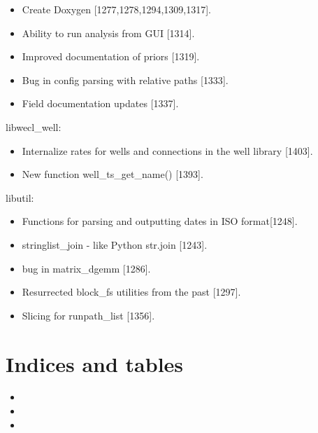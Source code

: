 \documentclass[a4paper,10pt,english]{sphinxmanual}
\begin{document}
\begin{itemize}
\item {} 
Create Doxygen {[}1277,1278,1294,1309,1317{]}.

\item {} 
Ability to run analysis from GUI {[}1314{]}.

\item {} 
Improved documentation of priors {[}1319{]}.

\item {} 
Bug in config parsing with relative paths {[}1333{]}.

\item {} 
Field documentation updates {[}1337{]}.

\end{itemize}

libwecl\_well:
\begin{itemize}
\item {} 
Internalize rates for wells and connections in the well library
{[}1403{]}.

\item {} 
New function well\_ts\_get\_name() {[}1393{]}.

\end{itemize}

libutil:
\begin{itemize}
\item {} 
Functions for parsing and outputting dates in ISO format{[}1248{]}.

\item {} 
stringlist\_join - like Python str.join {[}1243{]}.

\item {} 
bug in matrix\_dgemm {[}1286{]}.

\item {} 
Resurrected block\_fs utilities from the past {[}1297{]}.

\item {} 
Slicing for runpath\_list {[}1356{]}.

\end{itemize}


\chapter{Indices and tables}
\label{\detokenize{manual:indices-and-tables}}\begin{itemize}
\item {} 

\item {} 

\item {} 

\end{itemize}



\renewcommand{\indexname}{Index}
\printindex
\end{document}
